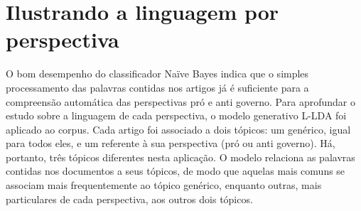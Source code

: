 



\section{Ilustrando a linguagem por perspectiva}
\label{estudo:sec3}


O bom desempenho do classificador Naïve Bayes indica que o simples processamento das palavras contidas nos artigos já é suficiente para a compreensão automática das perspectivas pró e anti governo. Para aprofundar o estudo sobre a linguagem de cada perspectiva, o modelo generativo L-LDA foi aplicado ao corpus. Cada artigo foi associado a dois tópicos: um genérico, igual para todos eles, e um referente à sua perspectiva (pró ou anti governo). Há, portanto, três tópicos diferentes nesta aplicação. O modelo relaciona as palavras contidas nos documentos a seus tópicos, de modo que aquelas mais comuns se associam mais frequentemente ao tópico genérico, enquanto outras, mais particulares de cada perspectiva, aos outros dois tópicos.   




